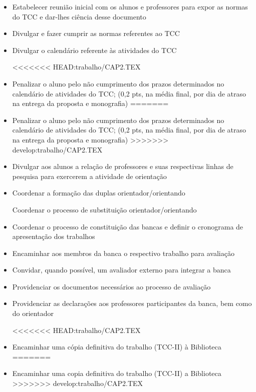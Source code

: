 	\begin{itemize}
		\item Estabelecer reunião inicial com os alunos e professores para expor as normas do TCC e dar-lhes ciência desse documento

		\item Divulgar e fazer cumprir as normas referentes ao TCC
		
		\item Divulgar o calendário referente às atividades do TCC

<<<<<<< HEAD:trabalho/CAP2.TEX
		\item Penalizar o aluno pelo não cumprimento dos prazos determinados no calendário de atividades do TCC; (0,2 pts, na média final, por dia de atraso na entrega 		da proposta e monografia)
=======
		\item Penalizar o aluno pelo não cumprimento dos prazos determinados no calendário de atividades do TCC; (0,2 pts, na m\'edia final, por dia de atraso na entrega 		da proposta e monografia)
>>>>>>> develop:trabalho/CAP2.TEX
		
		\item Divulgar aos alunos a relação de professores e suas respectivas linhas de pesquisa para exercerem a atividade de orientação
		
		\item Coordenar a formação das duplas orientador/orientando

		\intem Coordenar o processo de substituição orientador/orientando
		
		\item Coordenar o processo de constituição das bancas e definir o cronograma de apresentação dos trabalhos
		
		\item Encaminhar aos membros da banca o respectivo trabalho para avaliação
		
		\item Convidar, quando possível, um avaliador externo para integrar a banca
		
		\item Providenciar os documentos necessários ao processo de avaliação

		\item Providenciar as declarações aos professores participantes da banca, bem como do orientador
		
<<<<<<< HEAD:trabalho/CAP2.TEX
		\item Encaminhar uma cópia definitiva do trabalho (TCC-II) à Biblioteca
=======
		\item Encaminhar uma c\´opia definitiva do trabalho (TCC-II) \´a Biblioteca
>>>>>>> develop:trabalho/CAP2.TEX
		
	\end{itemize}


